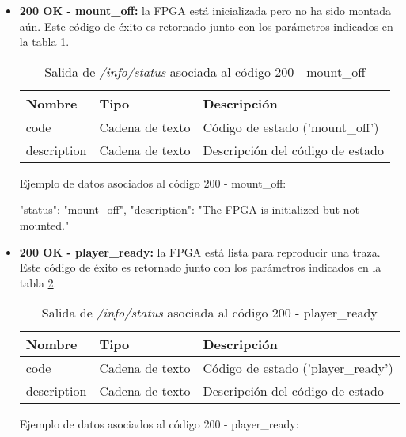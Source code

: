 \begin{itemize}
{\begin{minipage}{\textwidth}
\begin{code}[language=json]
{
  "status": "init_off",
  "description": "The FPGA is not configured either as player or as recorder yet."
}
\end{code}
\end{minipage}
}

\item{\textbf{200 OK - mount\_off:} la \gls{FPGA} está inicializada pero no ha sido montada aún. Este código de éxito es retornado junto con los parámetros indicados en la tabla \ref{extra:api:infostatus:mountoff}.
\begin{table}[H]
\centering
\begin{tabular}{|l|l|l|}
\hline
\rowcolor[HTML]{F5F5F5}
\textbf{Nombre}  & \textbf{Tipo}   & \textbf{Descripción}               \\ \hline
code             & Cadena de texto & Código de estado ('mount\_off')    \\ \hline
description      & Cadena de texto & Descripción del código de estado   \\ \hline
\end{tabular}
\caption{Salida de \textit{/info/status} asociada al código 200 - mount\_off}
\label{extra:api:infostatus:mountoff}
\end{table}
\begin{minipage}{\textwidth}
Ejemplo de datos asociados al código 200 - mount\_off:

\begin{code}[language=json]
{
  "status": "mount_off",
  "description": "The FPGA is initialized but not mounted."
}
\end{code}
\end{minipage}
}

\item{\textbf{200 OK - player\_ready:} la \gls{FPGA} está lista para reproducir una \gls{traza}. Este código de éxito es retornado junto con los parámetros indicados en la tabla \ref{extra:api:infostatus:playerready}.
\begin{table}[H]
\centering
\begin{tabular}{|l|l|l|}
\hline
\rowcolor[HTML]{F5F5F5}
\textbf{Nombre}  & \textbf{Tipo}   & \textbf{Descripción}               \\ \hline
code             & Cadena de texto & Código de estado ('player\_ready') \\ \hline
description      & Cadena de texto & Descripción del código de estado   \\ \hline
\end{tabular}
\caption{Salida de \textit{/info/status} asociada al código 200 - player\_ready}
\label{extra:api:infostatus:playerready}
\end{table}
\begin{minipage}{\textwidth}
Ejemplo de datos asociados al código 200 - player\_ready:


\end{minipage}}
\end{itemize}
